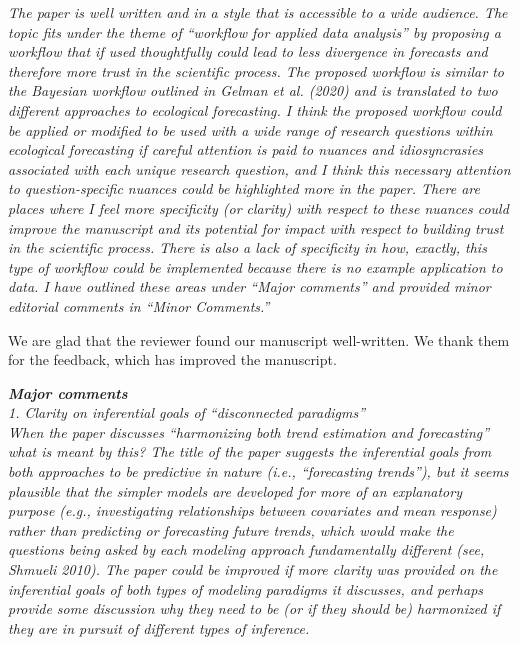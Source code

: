 \documentclass[11pt,letter]{article}
\begin{document}
\begin{mybox}
\emph{The paper is well written and in a style that is accessible to a wide audience. The topic fits under the theme of “workflow for applied data analysis” by proposing a workflow that if used thoughtfully could lead to less divergence in forecasts and therefore more trust in the scientific process. The proposed workflow is similar to the Bayesian workflow outlined in Gelman et al. (2020) and is translated to two different approaches to ecological forecasting. I think the proposed workflow could be applied or modified to be used with a wide range of research questions within ecological forecasting if careful attention is paid to nuances and idiosyncrasies associated with each unique research question, and I think this necessary attention to question-specific nuances could be highlighted more in the paper. There are places where I feel more specificity (or clarity) with respect to these nuances could improve the manuscript and its potential for impact with respect to building trust in the scientific process. There is also a lack of specificity in how, exactly, this type of workflow could be implemented because there is no example application to data. I have outlined these areas under “Major comments” and provided minor editorial comments in “Minor Comments.”}
\end{mybox}


We are glad that the reviewer found our manuscript well-written. 
We thank them for the feedback, which has improved the manuscript.

\begin{mybox}
\emph{\textbf{Major comments}\\
1. Clarity on inferential goals of “disconnected paradigms”\\
 When the paper discusses “harmonizing both trend estimation and forecasting” what is meant by this? The title of the paper suggests the inferential goals from both approaches to be predictive in nature (i.e., “forecasting trends”), but it seems plausible that the simpler models are developed for more of an explanatory purpose (e.g., investigating relationships between covariates and mean response) rather than predicting or forecasting future trends, which would make the questions being asked by each modeling approach fundamentally different (see, Shmueli 2010). The paper could be improved if more clarity was provided on the inferential goals of both types of modeling paradigms it discusses, and perhaps provide some discussion why they need to be (or if they should be) harmonized if they are in pursuit of different types of inference.}
\end{mybox}
\end{document}
